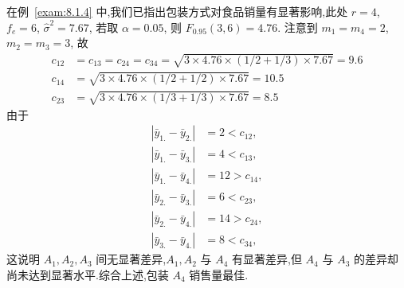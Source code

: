 \begin{example}\label{exam:8.2.3}
  在例~\ref{exam:8.1.4} 中,我们已指出包装方式对食品销量有显著影响,此处 $r=4$, $f_e = 6$, $\hat{\sigma}^2 = 7.67$, 若取 $\alpha = 0.05$, 则 $F_{0.95}(3,6) = 4.76$. 注意到 $m_1 = m_4 = 2$, $m_2=m_3=3$, 故
  \begin{align*} 
    c_{12} &=c_{13}=c_{24}=c_{34}=\sqrt{3 \times 4.76 \times(1 / 2+1 / 3) \times 7.67}=9.6 \\ 
    c_{14} &=\sqrt{3 \times 4.76 \times(1 / 2+1 / 2) \times 7.67}=10.5 \\ 
    c_{23} &=\sqrt{3 \times 4.76 \times(1 / 3+1 / 3) \times 7.67}=8.5 
  \end{align*}
  由于
  \begin{align*}
    \left|\bar{y}_{1.}-\bar{y}_{2.} \right| &=  2 < c_{12},\\
    \left|\bar{y}_{1.}-\bar{y}_{3.} \right| &=  4 < c_{13},\\
    \left|\bar{y}_{1.}-\bar{y}_{4.} \right| &= 12 > c_{14},\\
    \left|\bar{y}_{2.}-\bar{y}_{3.} \right| &=  6 < c_{23},\\
    \left|\bar{y}_{2.}-\bar{y}_{4.} \right| &= 14 > c_{24},\\
    \left|\bar{y}_{3.}-\bar{y}_{4.} \right| &=  8 < c_{34},   
  \end{align*}
这说明 $A_1, A_2, A_3$ 间无显著差异,$A_1, A_2$ 与 $A_4$ 有显著差异,但 $A_4$ 与 $A_3$ 的差异却尚未达到显著水平.综合上述,包装 $A_4$ 销售量最佳.
\end{example}

